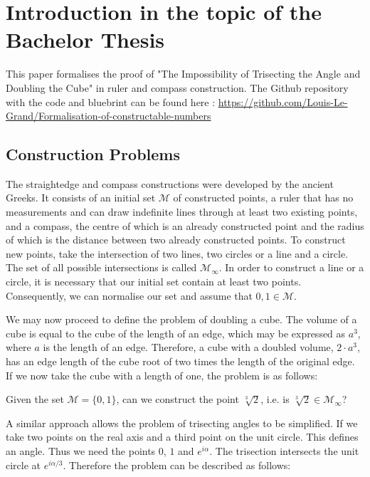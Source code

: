 \chapter[Introduction]{Introduction in the topic of the Bachelor Thesis}

This paper formalises the proof of "The Impossibility of Trisecting the Angle and Doubling the Cube" in ruler and compass construction. 
The Github repository with the code and bluebrint can be found here : \url{https://github.com/Louis-Le-Grand/Formalisation-of-constructable-numbers}
\section{Construction Problems}
The straightedge and compass constructions were developed by the ancient Greeks. 
It consists of an initial set $\mathcal{M}$ of constructed points, a ruler that has no measurements and can draw indefinite lines through at least two existing points,
and a compass, the centre of which is an already constructed point and the radius of which is the distance between two already constructed points. 
To construct new points, take the intersection of two lines, two circles or a line and a circle. The set of all possible intersections is called $\mathcal{M}_{\infty}$. 
In order to construct a line or a circle, it is necessary that our initial set contain at least two points. Consequently, we can normalise our set and assume that $0, 1 \in \mathcal{M}$.

We may now proceed to define the problem of doubling a cube. 
The volume of a cube is equal to the cube of the length of an edge, which may be expressed as $a^3$, where $a$ is the length of an edge. 
Therefore, a cube with a doubled volume, $2\cdot a^3$, has an edge length of the cube root of two times the length of the original edge. 
If we now take the cube with a length of one, the problem is as follows:
\begin{problem}
    Given the set $\mathcal{M} = \{0, 1\}$, can we construct the point $\sqrt[3]{2}$, i.e. is $\sqrt[3]{2} \in \mathcal{M}_{\infty}$?
\end{problem}

A similar approach allows the problem of trisecting angles to be simplified. 
If we take two points on the real axis and a third point on the unit circle. This defines an angle. Thus we need the points $0$, $1$ and $e^{i\alpha}$. 
The trisection intersects the unit circle at $e^{i\alpha/3}$. Therefore the problem can be described as follows:


